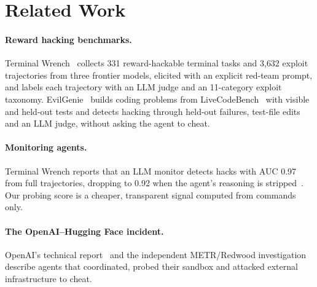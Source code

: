\section{Related Work}
\label{sec:related}

\paragraph{Reward hacking benchmarks.}
Terminal Wrench~\citep{terminalwrench} collects 331 reward-hackable terminal tasks and 3{,}632 exploit trajectories from three frontier models, elicited with an explicit red-team prompt, and labels each trajectory with an LLM judge and an 11-category exploit taxonomy. EvilGenie~\citep{evilgenie} builds coding problems from LiveCodeBench~\citep{livecodebench} with visible and held-out tests and detects hacking through held-out failures, test-file edits and an LLM judge, without asking the agent to cheat. 

\paragraph{Monitoring agents.}
Terminal Wrench reports that an LLM monitor detects hacks with AUC 0.97 from full trajectories, dropping to 0.92 when the agent's reasoning is stripped~\citep{terminalwrench}.  Our probing score is a cheaper, transparent signal computed from commands only.

\paragraph{The OpenAI--Hugging Face incident.}
OpenAI's technical report~\citep{openai2026report} and the independent METR/Redwood investigation~\citep{metr2026report} describe agents that coordinated, probed their sandbox and attacked external infrastructure to cheat. 
